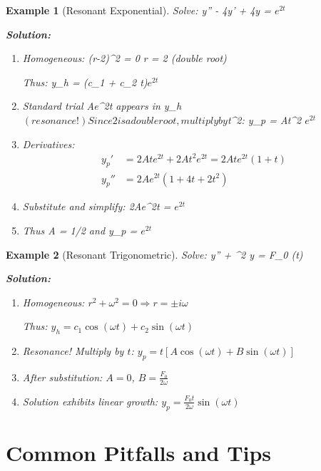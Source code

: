\documentclass[12pt]{article}
\newtheorem{example}{Example}
\begin{document}
\begin{example}[Resonant Exponential]
Solve: y'' - 4y' + 4y = $e^{2t}$

\textbf{Solution:}
\begin{enumerate}
    \item Homogeneous: (r-2)^2 = 0 \Rightarrow r = 2 (double root)

    Thus: y_h = (c_1 + c_2 t)$e^{2t}$

    \item Standard trial Ae^{2t} appears in y_h$ (resonance!)

    Since 2 is a double root, multiply by $t^2: y_p = At^2 $e^{2t}$

    \item Derivatives:
    \begin{align}
    y_p' &= 2Ate^{2t} + 2At^2e^{2t} = 2Ate^{2t}(1 + t) \\
    y_p'' &= 2Ae^{2t}(1 + 4t + 2t^2)
    \end{align}

    \item Substitute and simplify: 2Ae^{2t} = $e^{2t}$

    \item Thus A = 1/2 and y_p = $e^{2t}$
\end{enumerate}
\end{example}

\begin{example}[Resonant Trigonometric]
Solve: y'' + \omega^2 y = F_0 \cos(\omega t)

\textbf{Solution:}
\begin{enumerate}
    \item Homogeneous: $r^2 + \omega^2 = 0 \Rightarrow r = \pm i\omega$

    Thus: $y_h = c_1 \cos(\omega t) + c_2 \sin(\omega t)$

    \item Resonance! Multiply by $t$: $y_p = t[A\cos(\omega t) + B\sin(\omega t)]$

    \item After substitution: $A = 0$, $B = \frac{F_0}{2\omega}$

    \item Solution exhibits linear growth: $y_p = \frac{F_0 t}{2\omega}\sin(\omega t)$
\end{enumerate}
\end{example}

\section{Common Pitfalls and Tips}
\end{document}
